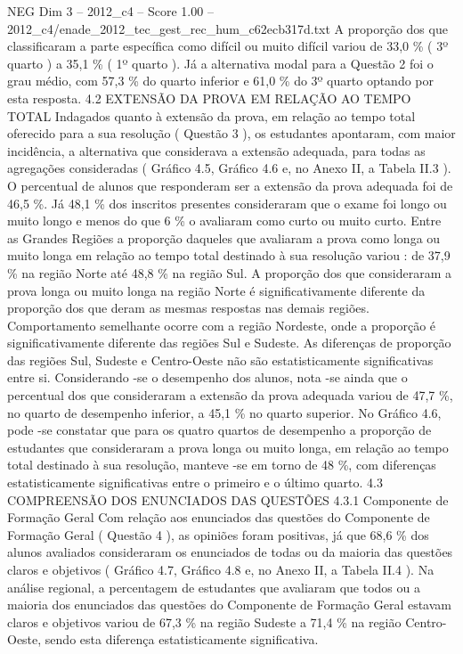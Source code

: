 \begin{textsample}{NEG Dim 3 – 2012\_c4 – Score 1.00 – 2012\_c4/enade\_2012\_tec\_gest\_rec\_hum\_c62ecb317d.txt}
A proporção dos que classificaram a parte específica como difícil ou muito difícil variou de 33,0 \% ( 3º quarto ) a 35,1 \% ( 1º quarto ).
Já a alternativa modal para a Questão 2 foi o grau médio, com 57,3 \% do quarto inferior e 61,0 \% do 3º quarto optando por esta resposta. 4.2 EXTENSÃO DA PROVA EM RELAÇÃO AO TEMPO TOTAL Indagados quanto à extensão da prova, em relação ao tempo total oferecido para a sua resolução ( Questão 3 ), os estudantes apontaram, com maior incidência, a alternativa que considerava a extensão adequada, para todas as agregações consideradas ( Gráfico 4.5, Gráfico 4.6 e, no Anexo II, a Tabela II.3 ).
O percentual de alunos que responderam ser a extensão da prova adequada foi de 46,5 \%.
Já 48,1 \% dos inscritos presentes consideraram que o exame foi longo ou muito longo e menos do que 6 \% o avaliaram como curto ou muito curto.
Entre as Grandes Regiões a proporção daqueles que avaliaram a prova como longa ou muito longa em relação ao tempo total destinado à sua resolução variou : de 37,9 \% na região Norte até 48,8 \% na região Sul.
A proporção dos que consideraram a prova longa ou muito longa na região Norte é significativamente diferente da proporção dos que deram as mesmas respostas nas demais regiões.
Comportamento semelhante ocorre com a região Nordeste, onde a proporção é significativamente diferente das regiões Sul e Sudeste.
As diferenças de proporção das regiões Sul, Sudeste e Centro-Oeste não são estatisticamente significativas entre si.
Considerando -se o desempenho dos alunos, nota -se ainda que o percentual dos que consideraram a extensão da prova adequada variou de 47,7 \%, no quarto de desempenho inferior, a 45,1 \% no quarto superior.
No Gráfico 4.6, pode -se constatar que para os quatro quartos de desempenho a proporção de estudantes que consideraram a prova longa ou muito longa, em relação ao tempo total destinado à sua resolução, manteve -se em torno de 48 \%, com diferenças estatisticamente significativas entre o primeiro e o último quarto. 4.3 COMPREENSÃO DOS ENUNCIADOS DAS QUESTÕES 4.3.1 Componente de Formação Geral Com relação aos enunciados das questões do Componente de Formação Geral ( Questão 4 ), as opiniões foram positivas, já que 68,6 \% dos alunos avaliados consideraram os enunciados de todas ou da maioria das questões claros e objetivos ( Gráfico 4.7, Gráfico 4.8 e, no Anexo II, a Tabela II.4 ).
Na análise regional, a percentagem de estudantes que avaliaram que todos ou a maioria dos enunciados das questões do Componente de Formação Geral estavam claros e objetivos variou de 67,3 \% na região Sudeste a 71,4 \% na região Centro-Oeste, sendo esta diferença estatisticamente significativa.

\end{textsample}
